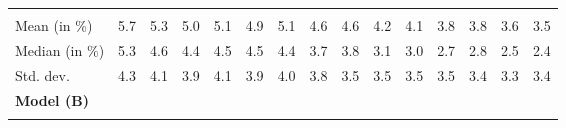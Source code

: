 \begin{tabular}{lllllllllllllll}
  \multicolumn{1}{|r}{} &
  \multicolumn{1}{r}{} &
  \multicolumn{1}{r}{} &
  \multicolumn{1}{r}{} &
  \multicolumn{1}{r}{} &
  \multicolumn{1}{r}{} &
  \multicolumn{1}{r}{} &
  \multicolumn{1}{r}{} &
  \multicolumn{1}{r}{} &
  \multicolumn{1}{r}{} &
  \multicolumn{1}{r}{} &
  \multicolumn{1}{r}{} &
  \multicolumn{1}{r}{} &
  \multicolumn{1}{r}{} \\
\multicolumn{1}{l}{\hspace{2em}Mean (in $\%$)} &
  \multicolumn{1}{|r}{5.7} &
  \multicolumn{1}{r}{5.3} &
  \multicolumn{1}{r}{5.0} &
  \multicolumn{1}{r}{5.1} &
  \multicolumn{1}{r}{4.9} &
  \multicolumn{1}{r}{5.1} &
  \multicolumn{1}{r}{4.6} &
  \multicolumn{1}{r}{4.6} &
  \multicolumn{1}{r}{4.2} &
  \multicolumn{1}{r}{4.1} &
  \multicolumn{1}{r}{3.8} &
  \multicolumn{1}{r}{3.8} &
  \multicolumn{1}{r}{3.6} &
  \multicolumn{1}{r}{3.5} \\
\multicolumn{1}{l}{\hspace{2em}Median (in $\%$)} &
  \multicolumn{1}{|r}{5.3} &
  \multicolumn{1}{r}{4.6} &
  \multicolumn{1}{r}{4.4} &
  \multicolumn{1}{r}{4.5} &
  \multicolumn{1}{r}{4.5} &
  \multicolumn{1}{r}{4.4} &
  \multicolumn{1}{r}{3.7} &
  \multicolumn{1}{r}{3.8} &
  \multicolumn{1}{r}{3.1} &
  \multicolumn{1}{r}{3.0} &
  \multicolumn{1}{r}{2.7} &
  \multicolumn{1}{r}{2.8} &
  \multicolumn{1}{r}{2.5} &
  \multicolumn{1}{r}{2.4} \\
\multicolumn{1}{l}{\hspace{2em}Std. dev.} &
  \multicolumn{1}{|r}{4.3} &
  \multicolumn{1}{r}{4.1} &
  \multicolumn{1}{r}{3.9} &
  \multicolumn{1}{r}{4.1} &
  \multicolumn{1}{r}{3.9} &
  \multicolumn{1}{r}{4.0} &
  \multicolumn{1}{r}{3.8} &
  \multicolumn{1}{r}{3.5} &
  \multicolumn{1}{r}{3.5} &
  \multicolumn{1}{r}{3.5} &
  \multicolumn{1}{r}{3.5} &
  \multicolumn{1}{r}{3.4} &
  \multicolumn{1}{r}{3.3} &
  \multicolumn{1}{r}{3.4} \\ \hline
\multicolumn{1}{l}{{\textbf{Model (B)}}} &
  \multicolumn{1}{|r}{} &
  \multicolumn{1}{r}{} &
  \multicolumn{1}{r}{} &
  \multicolumn{1}{r}{} &
  \multicolumn{1}{r}{} &
  \multicolumn{1}{r}{} &
  \multicolumn{1}{r}{} &
  \multicolumn{1}{r}{} &
  \multicolumn{1}{r}{} &
  \multicolumn{1}{r}{} &
  \multicolumn{1}{r}{} &
  \multicolumn{1}{r}{} &
  \multicolumn{1}{r}{} &
  \multicolumn{1}{r}{} \\ \hline
\multicolumn{1}{l}{\hspace{1em}{\textit{Mult. term} ($\widehat{\tau}^{adv}-1$)}} &
  \multicolumn{1}{|r}{} &
  \multicolumn{1}{r}{} &
  \multicolumn{1}{r}{} &

\end{tabular}
